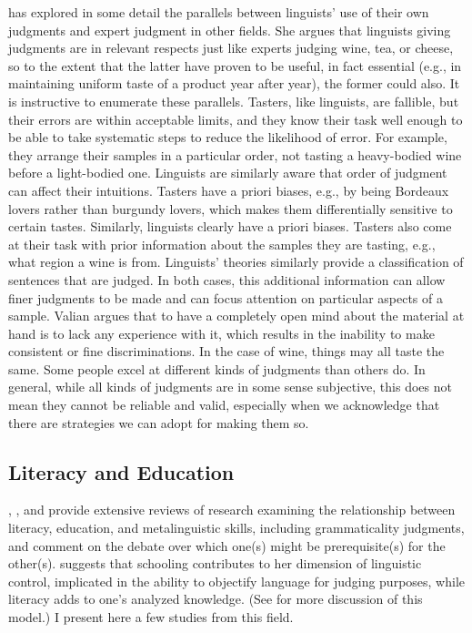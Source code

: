 \citet{Valian1982} has explored in some detail the parallels between linguists' use of their own judgments and expert judgment in other fields. She argues that linguists giving judgments are in relevant respects just like experts judging wine, tea, or cheese, so to the extent that the latter have proven to be useful, in fact essential (e.g., in maintaining uniform taste of a product year after year), the former could also. It is instructive to enumerate these parallels. Tasters, like linguists, are fallible, but their errors are within acceptable limits, and they know their task well enough to be able to take systematic steps to reduce the likelihood of error. For example, they arrange their samples in a particular order, not tasting a heavy-bodied wine before a light-bodied one. Linguists are similarly aware that order of judgment can affect their intuitions. Tasters have a priori biases, e.g., by being Bordeaux lovers rather than burgundy lovers, which makes them differentially sensitive to certain tastes. Similarly, linguists clearly have a priori biases. Tasters also come at their task with prior information about the samples they are tasting, e.g., what region a wine is from. Linguists' theories similarly provide a classification of sentences that are judged. In both cases, this additional information can allow finer judgments to be made and can focus attention on particular aspects of a sample. Valian argues that to have a completely open mind about the material at hand is to lack any experience with it, which results in the inability to
make consistent or fine discriminations. In the case of wine, things may all taste the same. Some people excel at different kinds of judgments than others do. In general, while all kinds of judgments are in some sense subjective, this does not mean they cannot be reliable and valid, especially when we acknowledge that there are strategies we can adopt for making them so.

\subsection{Literacy and Education}\label{sec:4.4.2}

\citet[31\textendash{}44]{Birdsong1989}, \citet{BialystokEtAl1985}, and \citet{MasnyEtAl1985} provide extensive reviews of research examining the relationship between literacy, education, and metalinguistic skills, including grammaticality judgments, and comment on the debate over which one(s) might be prerequisite(s) for the other(s). \citet{Bialystok1986} suggests that schooling contributes to her dimension of linguistic control, implicated in the ability to objectify language for judging purposes, while literacy adds to one's analyzed knowledge. (See  for more discussion of this model.) I present here a few studies from this field.

